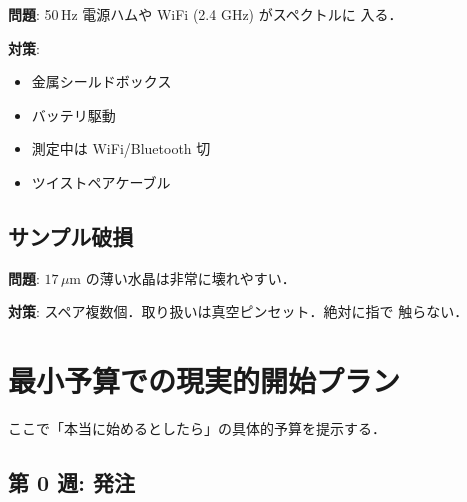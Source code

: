 \documentclass[11pt,a4paper]{article}
\begin{document}
\textbf{問題}: 50\,Hz 電源ハムや WiFi (2.4 GHz) がスペクトルに
入る．

\textbf{対策}:
\begin{itemize}
\item 金属シールドボックス
\item バッテリ駆動
\item 測定中は WiFi/Bluetooth 切
\item ツイストペアケーブル
\end{itemize}

\subsection{サンプル破損}

\textbf{問題}: $17\,\mu$m の薄い水晶は非常に壊れやすい．

\textbf{対策}: スペア複数個．取り扱いは真空ピンセット．絶対に指で
触らない．

\section{最小予算での現実的開始プラン}

ここで「本当に始めるとしたら」の具体的予算を提示する．

\subsection{第 0 週: 発注}
\end{document}
